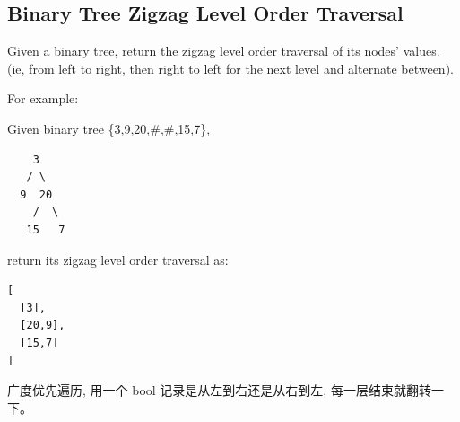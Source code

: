 \documentclass[12pt]{book}
\begin{document}
\subsection{Binary Tree Zigzag Level Order Traversal}
\label{sec-4-2-6}
Given a binary tree, return the zigzag level order traversal of its nodes' values. (ie, from left to right, then right to left for the next level and alternate between).

For example:

Given binary tree \{3,9,20,\#,\#,15,7\},
\lstset{language=java,label= ,caption= ,numbers=none}
\begin{lstlisting}
    3
   / \
  9  20
    /  \
   15   7
\end{lstlisting}
return its zigzag level order traversal as:
\lstset{language=java,label= ,caption= ,numbers=none}
\begin{lstlisting}
[
  [3],
  [20,9],
  [15,7]
]
\end{lstlisting}

广度优先遍历, 用一个 bool 记录是从左到右还是从右到左, 每一层结束就翻转一
下。
\end{document}
